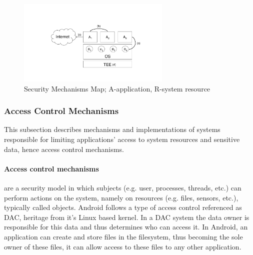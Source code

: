 \begin{figure}[t!]
	\centering
	\includegraphics[width=0.65\textwidth]{img/relwork.pdf}
	\caption{Security Mechanisms Map; A-application, R-system resource}
	\label{fig:relwork}
\end{figure}

\subsubsection{Access Control Mechanisms}

This subsection describes mechanisms and implementations of systems responsible for limiting applications' access to system resources and sensitive data, hence access control mechanisms.

\paragraph{\textbf{Access control mechanisms}} are a security model in which subjects (e.g. user, processes, threads, etc.) can perform actions on the system, namely on resources (e.g. files, sensors, etc.), typically called objects. Android follows a type of access control referenced as \ac{DAC}, heritage from it's Linux based kernel. In a \ac{DAC} system the data owner is responsible for this data and thus determines who can access it. %
In Android, an application can create and store files in the filesystem, thus becoming the sole owner of these files, it can allow access to these files to any other application.

